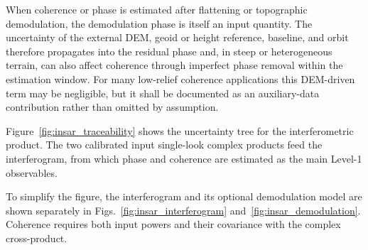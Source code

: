 When coherence or phase is estimated after flattening or topographic
demodulation, the demodulation phase is itself an input quantity. The
uncertainty of the external \ac{DEM}, geoid or height reference, baseline, and orbit
therefore propagates into the residual phase and, in steep or heterogeneous
terrain, can also affect coherence through imperfect phase removal within the
estimation window. For many low-relief coherence applications this \ac{DEM}-driven
term may be negligible, but it shall be documented as an auxiliary-data
contribution rather than omitted by assumption.


Figure~\ref{fig:insar_traceability} shows the uncertainty tree for the
interferometric product. The two calibrated input single-look complex products
feed the interferogram, from which phase and coherence are estimated as the
main Level-1 observables.


To simplify the figure, the interferogram and its optional demodulation model
are shown separately in Figs.~\ref{fig:insar_interferogram}
and~\ref{fig:insar_demodulation}. Coherence requires both input powers
and their covariance with the complex cross-product.








